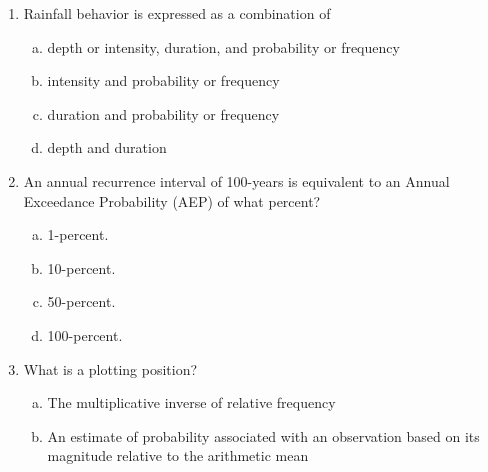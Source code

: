 \documentclass[12pt]{article}
\begin{document}
\begin{enumerate}
\item Rainfall behavior is expressed as a combination of 
\begin{enumerate}[a)]
\item depth or intensity, duration, and probability or frequency
\item intensity and probability or frequency
\item duration and probability or frequency
\item depth and duration
\end{enumerate}
\clearpage
\item An annual recurrence interval of 100-years is equivalent to an Annual Exceedance Probability (AEP) of what percent?
\begin{enumerate}[a)]
\item 1-percent.
\item 10-percent.
\item 50-percent.
\item 100-percent.
\end{enumerate}
\clearpage
\item What is a plotting position?
\begin{enumerate}[a)]
\item The multiplicative inverse of relative frequency
\item An estimate of probability associated with an observation based on its magnitude relative to the arithmetic mean

\end{enumerate}
\end{enumerate}
\end{document}
